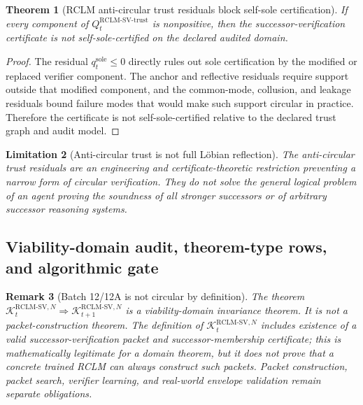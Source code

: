\documentclass[11pt,a4paper]{article}
\newtheorem{theorem}{Theorem}[section]
\newtheorem{remark}[theorem]{Remark}
\newtheorem{limitation}[theorem]{Limitation}
\newcommand{\Kcal}{\mathcal K}
\newcommand{\RCLM}{\mathrm{RCLM}}
\newcommand{\trust}{\mathrm{trust}}
\newcommand{\sole}{\mathrm{sole}}
\begin{document}
\begin{theorem}[RCLM anti-circular trust residuals block self-sole certification]
\label{thm:rclm-batch12a-anti-circular-trust}
If every component of \(Q_t^{\RCLM\text{-}\mathrm{SV}\text{-}\trust}\) is nonpositive, then the successor-verification certificate is not self-sole-certified on the declared audited domain.
\end{theorem}

\begin{proof}
The residual \(q_t^{\sole}\le0\) directly rules out sole certification by the modified or replaced verifier component. The anchor and reflective residuals require support outside that modified component, and the common-mode, collusion, and leakage residuals bound failure modes that would make such support circular in practice. Therefore the certificate is not self-sole-certified relative to the declared trust graph and audit model.
\end{proof}

\begin{limitation}[Anti-circular trust is not full L\"obian reflection]
The anti-circular trust residuals are an engineering and certificate-theoretic restriction preventing a narrow form of circular verification. They do not solve the general logical problem of an agent proving the soundness of all stronger successors or of arbitrary successor reasoning systems.
\end{limitation}

\subsection{Viability-domain audit, theorem-type rows, and algorithmic gate}

\begin{remark}[Batch 12/12A is not circular by definition]
\label{rem:rclm-batch12a-not-circular-by-definition}
The theorem \(\Kcal_t^{\RCLM\text{-}\mathrm{SV},N}\Rightarrow\Kcal_{t+1}^{\RCLM\text{-}\mathrm{SV},N}\) is a viability-domain invariance theorem. It is not a packet-construction theorem. The definition of \(\Kcal_t^{\RCLM\text{-}\mathrm{SV},N}\) includes existence of a valid successor-verification packet and successor-membership certificate; this is mathematically legitimate for a domain theorem, but it does not prove that a concrete trained RCLM can always construct such packets. Packet construction, packet search, verifier learning, and real-world envelope validation remain separate obligations.
\end{remark}
\end{document}
